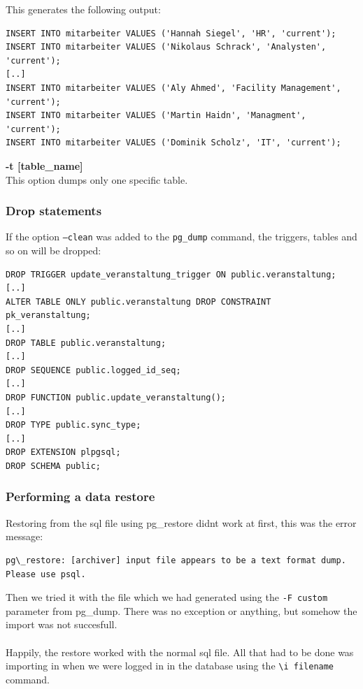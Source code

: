 \documentclass[10pt]{article}
\begin{document}
This generates the following output:
\begin{lstlisting}    
INSERT INTO mitarbeiter VALUES ('Hannah Siegel', 'HR', 'current');
INSERT INTO mitarbeiter VALUES ('Nikolaus Schrack', 'Analysten', 'current');
[..]
INSERT INTO mitarbeiter VALUES ('Aly Ahmed', 'Facility Management', 'current');
INSERT INTO mitarbeiter VALUES ('Martin Haidn', 'Managment', 'current');
INSERT INTO mitarbeiter VALUES ('Dominik Scholz', 'IT', 'current');
\end{lstlisting}    
\textbf{-t [table\_name]}\\
This option dumps only one specific table.
\subsubsection{Drop statements}
If the option \texttt{--clean} was added to the \texttt{pg\_dump} command, the triggers, tables and so on will be dropped:
\begin{lstlisting}    
DROP TRIGGER update_veranstaltung_trigger ON public.veranstaltung;
[..]
ALTER TABLE ONLY public.veranstaltung DROP CONSTRAINT pk_veranstaltung;
[..]
DROP TABLE public.veranstaltung;
[..]
DROP SEQUENCE public.logged_id_seq;
[..]
DROP FUNCTION public.update_veranstaltung();
[..]
DROP TYPE public.sync_type;
[..]
DROP EXTENSION plpgsql;
DROP SCHEMA public;
\end{lstlisting}    
\subsubsection{Performing a data restore}
Restoring from the sql file using pg\_restore didnt work at first, this was the error message:
\begin{lstlisting}    
pg\_restore: [archiver] input file appears to be a text format dump. Please use psql.
\end{lstlisting}    
Then we tried it with the file which we had generated using the \texttt{-F custom} parameter from pg\_dump.
There was no exception or anything, but somehow the import was not succesfull.
\\
\\
Happily, the restore worked with the normal sql file. All that had to be done was importing in when we were logged in in the database using the \texttt{\textbackslash i filename} command.
\end{document}
